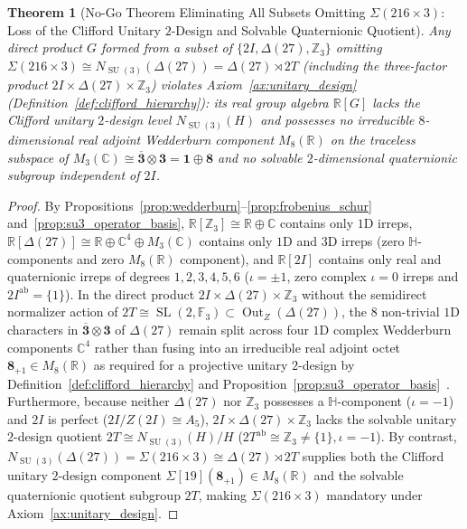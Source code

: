 \documentclass[11pt,a4paper]{article}
\newtheorem{theorem}{Theorem}[section]
\theoremstyle{definition}
\theoremstyle{remark}
\newcommand{\R}{\mathbb{R}}
\newcommand{\C}{\mathbb{C}}
\newcommand{\quat}{\mathbb{H}}
\newcommand{\Z}{\mathbb{Z}}
\newcommand{\F}{\mathbb{F}}
\newcommand{\SU}{\operatorname{SU}}
\newcommand{\SL}{\operatorname{SL}}
\begin{document}
\begin{theorem}[No-Go Theorem Eliminating All Subsets Omitting $\Sigma(216 \times 3)$: Loss of the Clifford Unitary $2$-Design and Solvable Quaternionic Quotient]
\label{thm:nogo_sigma}
Any direct product $G$ formed from a subset of $\{2I, \Delta(27), \Z_3\}$ omitting $\Sigma(216 \times 3) \cong N_{\SU(3)}(\Delta(27)) = \Delta(27) \rtimes 2T$ (including the three-factor product $2I \times \Delta(27) \times \Z_3$) violates Axiom~\ref{ax:unitary_design} (Definition~\ref{def:clifford_hierarchy}): its real group algebra $\R[G]$ lacks the Clifford unitary $2$-design level $N_{\SU(3)}(H)$ and possesses no irreducible $8$-dimensional real adjoint Wedderburn component $M_8(\R)$ on the traceless subspace of $M_3(\C) \cong \overline{\mathbf{3}} \otimes \mathbf{3} = \mathbf{1} \oplus \mathbf{8}$ and no solvable $2$-dimensional quaternionic subgroup independent of $2I$.
\end{theorem}

\begin{proof}
By Propositions~\ref{prop:wedderburn}--\ref{prop:frobenius_schur} and~\ref{prop:su3_operator_basis}, $\R[\Z_3] \cong \R \oplus \C$ contains only $1$D irreps, $\R[\Delta(27)] \cong \R \oplus \C^4 \oplus M_3(\C)$ contains only $1$D and $3$D irreps (zero $\quat$-components and zero $M_8(\R)$ component), and $\R[2I]$ contains only real and quaternionic irreps of degrees $1, 2, 3, 4, 5, 6$ ($\iota = \pm 1$, zero complex $\iota = 0$ irreps and $2I^{\mathrm{ab}} = \{1\}$). In the direct product $2I \times \Delta(27) \times \Z_3$ without the semidirect normalizer action of $2T \cong \SL(2,\F_3) \subset \operatorname{Out}_Z(\Delta(27))$, the $8$ non-trivial $1$D characters in $\overline{\mathbf{3}} \otimes \mathbf{3}$ of $\Delta(27)$ remain split across four $1$D complex Wedderburn components $\C^4$ rather than fusing into an irreducible real adjoint octet $\mathbf{8}_{+1} \in M_8(\R)$ as required for a projective unitary $2$-design by Definition~\ref{def:clifford_hierarchy} and Proposition~\ref{prop:su3_operator_basis}~\cite{Gross2007}. Furthermore, because neither $\Delta(27)$ nor $\Z_3$ possesses a $\quat$-component ($\iota = -1$) and $2I$ is perfect ($2I/Z(2I) \cong A_5$), $2I \times \Delta(27) \times \Z_3$ lacks the solvable unitary $2$-design quotient $2T \cong N_{\SU(3)}(H)/H$ ($2T^{\mathrm{ab}} \cong \Z_3 \neq \{1\}, \iota = -1$). By contrast, $N_{\SU(3)}(\Delta(27)) = \Sigma(216 \times 3) \cong \Delta(27) \rtimes 2T$ supplies both the Clifford unitary $2$-design component $\Sigma[19](\mathbf{8}_{+1}) \in M_8(\R)$ and the solvable quaternionic quotient subgroup $2T$, making $\Sigma(216 \times 3)$ mandatory under Axiom~\ref{ax:unitary_design}.
\end{proof}
\end{document}
